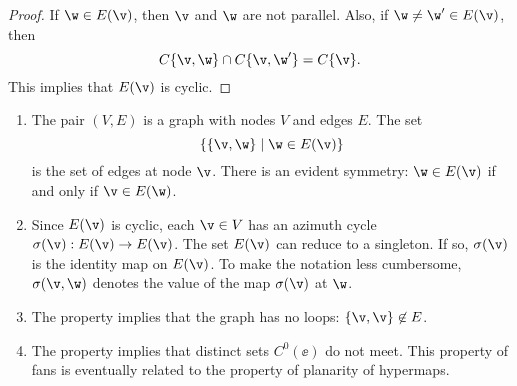 \begin{proof}  If $\w\in E(\v)$, then $\v$ and $\w$ are not parallel.
Also, if $\w\ne \w'\in E(\v)$, then
\[ 
C\{\v,\w\}\cap C\{\v,\w'\} = C\{\v\}.
\] 
This implies that $E(\v)$ is cyclic.
\end{proof}

\begin{remark}\label{rem:fan}
\begin{enumerate}\wasitemize 
\item The pair $(V,E)$ is a graph with nodes $V$ and edges $E$.  The set
\[ \{\{\v,\w\}\mid \w\in E(\v)\}\]  is
the set of edges at node $\v$.  There is an evident symmetry: $\w\in
E(\v)$ if and only if $\v\in E(\w)$.
%
\item {}%
  Since $E(\v)$ is cyclic, each $\v\in V$ has an azimuth cycle
  $\sigma(\v):E(\v)\to E(\v)$.  The set $E(\v)$ can reduce to a
  singleton. If so, $\sigma(\v)$ is the identity map on $E(\v)$.
%
To make the notation less cumbersome, $\sigma(\v,\w)$ denotes the
value of the map $\sigma(\v)$ at $\w$.
%
\item The property  implies that the graph has no
loops: $\{\v,\v\}\not\in E$.
%
\item The property  implies that distinct sets
$C^0(\ee)$ do not meet.  This property of fans is eventually
related to the property of planarity of hypermaps.
%
%
%
%
\end{enumerate}\wasitemize 
\end{remark}

